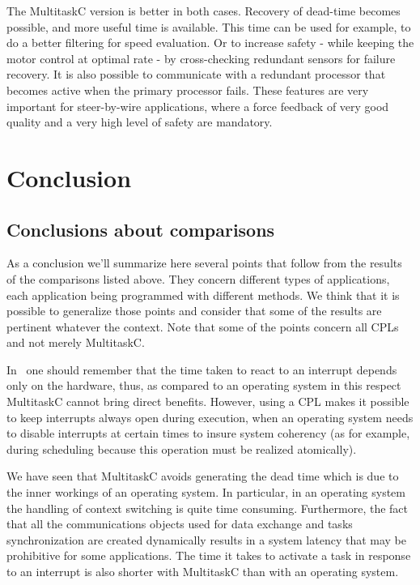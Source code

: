 \documentclass[10pt]{report}
\begin{document}
The MultitaskC version is better in both cases. Recovery of dead-time becomes possible, and more useful time is available. 
This time can be used for example, to do a better filtering for speed evaluation. Or to increase safety - while keeping the 
motor control at optimal rate - by cross-checking redundant sensors for failure recovery. It is also possible to communicate 
with a redundant processor that becomes active when the primary processor fails. 
These features are very important for steer-by-wire applications, where a force feedback of very good quality and a very 
high level of safety are mandatory.

\chapter{Conclusion}
\label{sec:conclusion}

\section{Conclusions about comparisons}

As a conclusion we'll summarize here several points that follow from the results of the comparisons listed above. 
They concern different types of applications, each application being programmed with different methods. We think that 
it is possible to generalize those points and consider that some of the results are pertinent whatever the context. 
Note that some of the points concern all CPLs and not merely MultitaskC.

In~\cite{Delchini:95} one should remember that the time taken to react to an interrupt depends only on the hardware, 
thus, as compared to an operating system in this respect MultitaskC cannot bring direct benefits. However, using 
a CPL makes it possible to keep interrupts always open during execution, when an operating system needs to disable 
interrupts at certain times to insure system coherency (as for example, during scheduling because this operation must be 
realized atomically).

We have seen that MultitaskC avoids generating the dead time which is due to the inner workings of an operating system.
In particular, in an operating system the handling of context switching is quite time consuming. Furthermore, the fact that all 
the communications objects used for data exchange and tasks synchronization are created dynamically results in a system latency 
that may be prohibitive for some applications. The time it takes to activate a task in response to an interrupt is also shorter 
with MultitaskC than with an operating system.
\end{document}
